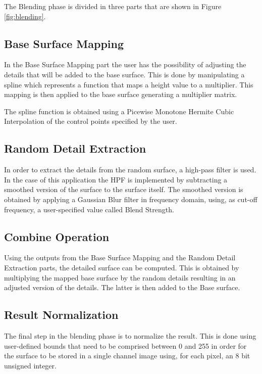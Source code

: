   The Blending phase is divided in three parts that are shown in Figure \ref{fig:blending}. 
  
  \subsection {Base Surface Mapping}
  
	In the Base Surface Mapping part the user has the possibility of adjusting the details that will be added to the base surface. This is done by manipulating a spline which represents a function that maps a height value to a multiplier. This mapping is then applied to the base surface generating a multiplier matrix.
	
	The spline function is obtained using a Picewise Monotone Hermite Cubic Interpolation of the control points specified by the user. 
    
  \subsection{Random Detail Extraction}

	In order to extract the details from the random surface, a high-pass filter is used. In the case of this application the HPF is implemented by subtracting a smoothed version of the surface to the surface itself. The smoothed version is obtained by applying a Gaussian Blur filter in frequency domain, using, as cut-off frequency, a user-specified value called Blend Strength.
      
  \subsection{Combine Operation}
  
    Using the outputs from the Base Surface Mapping and the Random Detail Extraction parts, the detailed surface can be computed. This is obtained by multiplying the mapped base surface by the random details resulting in an adjusted version of the details. The latter is then added to the Base surface.
      
  \subsection{Result Normalization}
  
	The final step in the blending phase is to normalize the result. This is done using user-defined bounds that need to be comprised between 0 and 255 in order for the surface to be stored in a single channel image using, for each pixel, an 8 bit unsigned integer.
    
